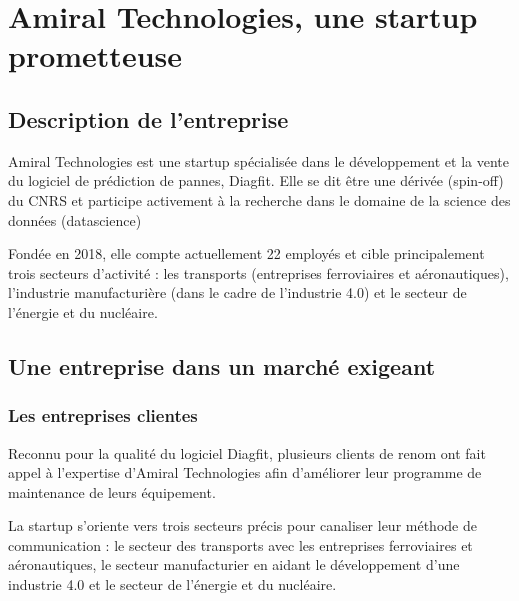 \section{Amiral Technologies, une startup prometteuse}
\subsection{Description de l'entreprise}
Amiral Technologies est une startup spécialisée dans le développement et la vente du logiciel de prédiction de pannes, Diagfit. Elle se dit être une dérivée (spin-off) du CNRS et participe activement à la recherche dans le domaine de la science des données (datascience)

Fondée en 2018, elle compte actuellement 22 employés et cible principalement trois secteurs d'activité : les transports (entreprises ferroviaires et aéronautiques), l'industrie manufacturière (dans le cadre de l'industrie 4.0) et le secteur de l'énergie et du nucléaire.
\newpage
\subsection{Une entreprise dans un marché exigeant}
\subsubsection{Les entreprises clientes}
Reconnu pour la qualité du logiciel Diagfit, plusieurs clients de renom ont fait appel à l’expertise d’Amiral Technologies afin d'améliorer leur programme de maintenance de leurs équipement.

La startup s'oriente vers trois secteurs précis pour canaliser leur méthode de communication : le secteur des transports avec les entreprises ferroviaires et aéronautiques, le secteur manufacturier en aidant le développement d'une industrie 4.0 et le secteur de l'énergie et du nucléaire.

